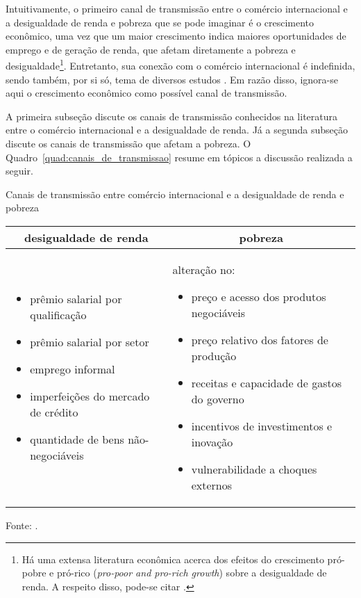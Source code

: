 Intuitivamente, o primeiro canal de transmissão entre o comércio internacional e a desigualdade de renda e pobreza que se pode imaginar é o crescimento econômico, uma vez que um maior crescimento indica maiores oportunidades de emprego e de geração de renda, que afetam diretamente a pobreza e desigualdade\footnote{Há uma extensa literatura econômica acerca dos efeitos do crescimento pró-pobre e pró-rico (\textit{pro-poor and pro-rich growth}) sobre a desigualdade de renda. A respeito disso, pode-se citar \textcite{ravallion04, thorbecke22}.}. Entretanto, sua conexão com o comércio internacional é indefinida, sendo também, por si só, tema de diversos estudos \cite{anderson16, dix17, gnangnon18}. Em razão disso, ignora-se aqui o crescimento econômico como possível canal de transmissão. 

A primeira subseção discute os canais de transmissão conhecidos na literatura entre o comércio internacional e a desigualdade de renda. Já a segunda subseção discute os canais de transmissão que afetam a pobreza. O Quadro~\ref{quad:canais_de_transmissao} resume em tópicos a discussão realizada a seguir.

\begin{quadro}[h]
	\begin{threeparttable}
		\centering
		\caption{Canais de transmissão entre comércio internacional e a desigualdade de renda e pobreza}
		\footnotesize
		\label{quad:canais_de_transmissao}
		\begin{tabular}{|| m{7.5cm} | m{7.5cm} ||}
			\hline \hline
			\multicolumn{1}{||c|}{\textbf{desigualdade de renda}} & \multicolumn{1}{c||}{\textbf{pobreza}} \\ \hline
			\begin{itemize}
				\item prêmio salarial por qualificação
				\item prêmio salarial por setor
				\item emprego informal
				\item imperfeições do mercado de crédito
				\item quantidade de bens não-negociáveis
			\end{itemize} &
			\vspace{0.2cm}
			alteração no:
			\begin{itemize}
			\item preço e acesso dos produtos negociáveis
			\item preço relativo dos fatores de produção
			\item receitas e capacidade de gastos do governo
			\item incentivos de investimentos e inovação
			\item vulnerabilidade a choques externos
			\end{itemize} \\ \hline \hline
		\end{tabular}
		\begin{tablenotes}
			\scriptsize
			\item Fonte: \textcite{bannisterthugge01, xu03, goldbergpavcnik04, banerjee04}.
		\end{tablenotes}
	\end{threeparttable}
\end{quadro}


